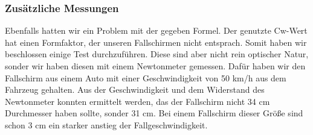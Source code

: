 \subsubsection{Zusätzliche Messungen}
Ebenfalls hatten wir ein Problem mit der gegeben Formel. Der genutzte Cw-Wert hat einen Formfaktor, der unseren Fallschirmen nicht entsprach. Somit haben wir beschlossen einige Test durchzuführen. Diese sind aber nicht rein optischer Natur, sonder wir haben diesen mit einem Newtonmeter gemessen. Dafür haben wir den Fallschirm aus einem Auto mit einer Geschwindigkeit von 50 km/h aus dem Fahrzeug gehalten. Aus der Geschwindigkeit und dem Widerstand des Newtonmeter konnten ermittelt werden, das der Fallschirm nicht 34 cm Durchmesser haben sollte, sonder 31 cm. Bei einem Fallschirm dieser Größe sind schon 3 cm ein starker anstieg der Fallgeschwindigkeit.

